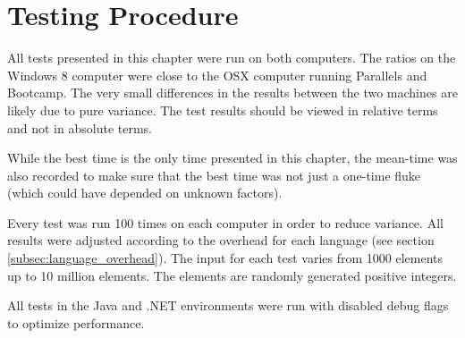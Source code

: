 \section{Testing Procedure}
All tests presented in this chapter were run on both computers. The ratios on the Windows 8 computer were close to the OSX computer running Parallels and Bootcamp. The very small differences in the results between the two machines are likely due to pure variance. The test results should be viewed in relative terms and not in absolute terms.

While the best time is the only time presented in this chapter, the mean-time was also recorded to make sure that the best time was not just a one-time fluke (which could have depended on unknown factors).

Every test was run 100 times on each computer in order to reduce variance. All results were adjusted according to the overhead for each language (see section \ref{subsec:language_overhead}). The input for each test varies from 1000 elements up to 10 million elements. The elements are randomly generated positive integers.

All tests in the Java and .NET environments were run with disabled debug flags to optimize performance.
